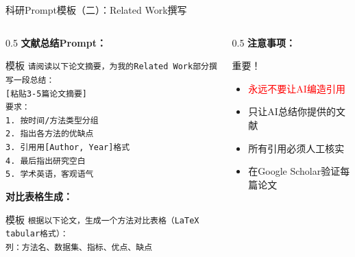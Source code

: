 \documentclass[aspectratio=169,11pt]{beamer}
\begin{document}
\begin{frame}[fragile]{科研Prompt模板（二）：Related Work撰写}
    \begin{columns}
        \begin{column}{0.5\textwidth}
            \textbf{文献总结Prompt：}
            \begin{exampleblock}{模板}
                \scriptsize
                \texttt{请阅读以下论文摘要，为我的Related Work部分撰写一段总结：}\\
                \texttt{[粘贴3-5篇论文摘要]}\\
                \texttt{要求：}\\
                \texttt{1. 按时间/方法类型分组}\\
                \texttt{2. 指出各方法的优缺点}\\
                \texttt{3. 引用用[Author, Year]格式}\\
                \texttt{4. 最后指出研究空白}\\
                \texttt{5. 学术英语，客观语气}
            \end{exampleblock}
            
            \vspace{0.2cm}
            \textbf{对比表格生成：}
            \begin{exampleblock}{模板}
                \scriptsize
                \texttt{根据以下论文，生成一个方法对比表格（LaTeX tabular格式）：}\\
                \texttt{列：方法名、数据集、指标、优点、缺点}
            \end{exampleblock}
        \end{column}
        \begin{column}{0.5\textwidth}
            \textbf{注意事项：}
            \begin{alertblock}{重要！}
                \begin{itemize}
                    \item \textcolor{red}{永远不要让AI编造引用}
                    \item 只让AI总结你提供的文献
                    \item 所有引用必须人工核实
                    \item 在Google Scholar验证每篇论文
                \end{itemize}
            \end{alertblock}
            

\end{column}
\end{columns}
\end{frame}
\end{document}
